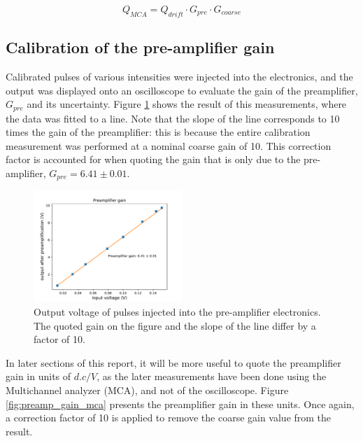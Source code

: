 \begin{equation}
  \label{eq:gain_system}
  Q_{MCA} = Q_{drift}\cdot G_{pre}\cdot G_{coarse}
\end{equation}


\subsection{Calibration of the pre-amplifier gain}
 Calibrated pulses of various intensities were injected into the electronics, and the output was displayed onto an oscilloscope to evaluate the gain of the preamplifier, $G_{pre}$ and its uncertainty. Figure \ref{fig:preamp_gain} shows the result of this measurements, where the data was fitted to a line. Note that the slope of the line corresponds to 10 times the gain of the preamplifier: this is because the entire calibration measurement was performed at a nominal coarse gain of 10. This correction factor is accounted for when quoting the gain that is only due to the pre-amplifier, $G_{pre} = 6.41 \pm 0.01$.

\begin{figure}[H]
  \includegraphics[scale=0.5,width=0.5\textwidth]{graphics/preamp_gain_calibration.pdf}
  \caption{Output voltage of pulses injected into the pre-amplifier electronics. The quoted gain on the figure and the slope of the line differ by a factor of 10.}
  \label{fig:preamp_gain}
\end{figure}

In later sections of this report, it will be more useful to quote the preamplifier gain in units of $d.c/V$, as the later measurements have been done using the Multichannel analyzer (MCA), and not of the oscilloscope. Figure \ref{fig:preamp_gain_mca} presents the preamplifier gain in these units. Once again, a correction factor of 10 is applied to remove the coarse gain value from the result.

